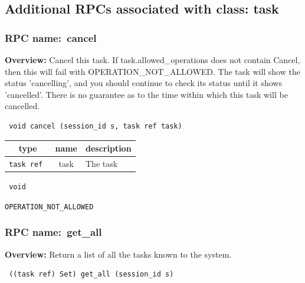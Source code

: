 \subsection{Additional RPCs associated with class: task}
\subsubsection{RPC name:~cancel}

{\bf Overview:} 
Cancel this task.  If task.allowed\_operations does not contain Cancel,
then this will fail with OPERATION\_NOT\_ALLOWED.  The task will show the
status 'cancelling', and you should continue to check its status until it
shows 'cancelled'.  There is no guarantee as to the time within which this
task will be cancelled.

\begin{verbatim} void cancel (session_id s, task ref task)\end{verbatim}



 
\vspace{0.3cm}
\begin{tabular}{|c|c|p{7cm}|}
 \hline
{\bf type} & {\bf name} & {\bf description} \\ \hline
{\tt task ref } & task & The task \\ \hline 

\end{tabular}

\vspace{0.3cm}

{\tt 
void
}



\vspace{0.3cm}

 {\tt OPERATION\_NOT\_ALLOWED}

\vspace{0.6cm}
\subsubsection{RPC name:~get\_all}

{\bf Overview:} 
Return a list of all the tasks known to the system.

\begin{verbatim} ((task ref) Set) get_all (session_id s)\end{verbatim}


